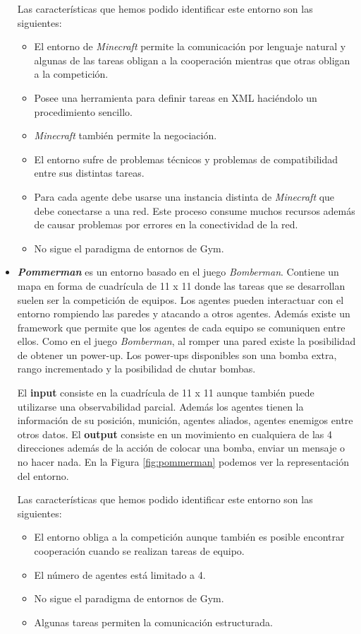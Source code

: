 \begin{itemize}
	      Las características que hemos podido identificar este entorno son las siguientes:
	      \begin{itemize}
		      \item El entorno de \textit{Minecraft} permite la comunicación por lenguaje natural y algunas de las tareas obligan a la cooperación mientras que otras obligan a la competición.
		      \item Posee una herramienta para definir tareas en XML haciéndolo un procedimiento sencillo.
		      \item \textit{Minecraft} también permite la negociación.
		      \item El entorno sufre de problemas técnicos y problemas de compatibilidad entre sus distintas tareas.
		      \item Para cada agente debe usarse una instancia distinta de \textit{Minecraft} que debe conectarse a una red. Este proceso consume muchos recursos además de causar problemas por errores en la conectividad de la red.
		      \item No sigue el paradigma de entornos de Gym.
	      \end{itemize}

	\item \textbf{\textit{Pommerman}} \cite {pommerman-repo} es un entorno basado en el juego \textit{Bomberman}. Contiene un mapa en forma de cuadrícula de 11 x 11 donde las tareas que se desarrollan suelen ser la competición de equipos. Los agentes pueden interactuar con el entorno rompiendo las paredes y atacando a otros agentes. Además existe un framework que permite que los agentes de cada equipo se comuniquen entre ellos. Como en el juego \textit{Bomberman}, al romper una pared existe la posibilidad de obtener un power-up. Los power-ups disponibles son una bomba extra, rango incrementado y la posibilidad de chutar bombas.  

	      El \textbf{input} consiste en la cuadrícula de 11 x 11 aunque también puede utilizarse una observabilidad parcial. Además los agentes tienen la información de su posición, munición, agentes aliados, agentes enemigos entre otros datos. El \textbf{output} consiste en un movimiento en cualquiera de las 4 direcciones además de la acción de colocar una bomba, enviar un mensaje o no hacer nada. En la Figura \ref {fig:pommerman} podemos ver la representación del entorno.

	      Las características que hemos podido identificar este entorno son las siguientes:
	      \begin{itemize}
		      \item El entorno obliga a la competición aunque también es posible encontrar cooperación cuando se realizan tareas de equipo.
		      \item El número de agentes está limitado a 4.
		      \item No sigue el paradigma de entornos de Gym.
		      \item Algunas tareas permiten la comunicación estructurada.
	      \end{itemize}


\end{itemize}
